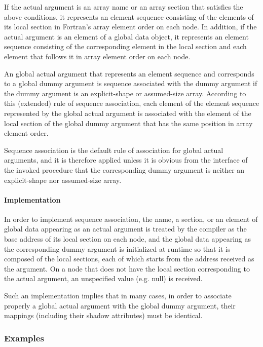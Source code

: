 If the actual argument is an array name or an array section that
satisfies the above conditions, it represents an element sequence
consisting of the elements of its local section in Fortran's array
element order on each node.
%
In addition, if the actual argument is an element of a global data object, it
represents an element sequence consisting of the corresponding element
in the local section and each element that follows it in array element
order on each node.

An global actual argument that represents an element sequence and
corresponds to a global dummy argument is sequence associated with
the dummy argument if the dummy argument is an explicit-shape or
assumed-size array.
%
According to this (extended) rule of sequence association, each element of
the element sequence represented by the global actual argument is
associated with the element of the local section of the global dummy
argument that has the same position in array element order.

Sequence association is the default rule of association for global
actual arguments, and it is therefore applied unless it is obvious from the
interface of the invoked procedure that the corresponding dummy argument
is neither an explicit-shape nor assumed-size array.


\paragraph*{Implementation}

In order to implement sequence association, the name, a section, or an
element of global data appearing as an actual argument is treated by
the {\XMP} compiler as the base address of its local section on each
node, and the global data appearing as the corresponding dummy argument
is initialized at runtime so that it is composed of the local sections,
each of which starts from the address received as the argument.
%
On a node that does not have the local section corresponding to the
actual argument, an unspecified value (e.g. null) is received.

Such an implementation implies that in many cases, in order to associate
properly a global actual argument with the global dummy argument, their
mappings (including their shadow attributes) must be identical.


\subsubsection*{Examples}

